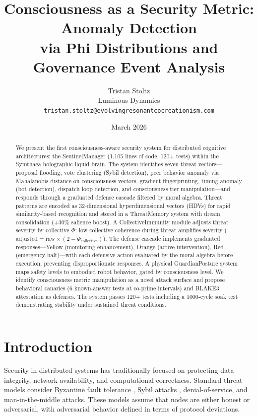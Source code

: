 \documentclass[11pt,a4paper]{article}
\title{Consciousness as a Security Metric: Anomaly Detection\\via Phi Distributions and Governance Event Analysis}
\author{
  Tristan Stoltz \\
  Luminous Dynamics \\
  \texttt{tristan.stoltz@evolvingresonantcocreationism.com}
}
\date{March 2026}
\begin{document}
\maketitle

\begin{abstract}
We present the first consciousness-aware security system for distributed cognitive architectures: the SentinelManager (1,105 lines of code, 120+ tests) within the Symthaea holographic liquid brain. The system identifies seven threat vectors---proposal flooding, vote clustering (Sybil detection), peer behavior anomaly via Mahalanobis distance on consciousness vectors, gradient fingerprinting, timing anomaly (bot detection), dispatch loop detection, and consciousness tier manipulation---and responds through a graduated defense cascade filtered by moral algebra. Threat patterns are encoded as 32-dimensional hyperdimensional vectors (HDVs) for rapid similarity-based recognition and stored in a ThreatMemory system with dream consolidation (+30\% salience boost). A CollectiveImmunity module adjusts threat severity by collective $\Phi$: low collective coherence during threat amplifies severity ($\text{adjusted} = \text{raw} \times (2 - \Phi_{\text{collective}})$). The defense cascade implements graduated responses---Yellow (monitoring enhancement), Orange (active intervention), Red (emergency halt)---with each defensive action evaluated by the moral algebra before execution, preventing disproportionate responses. A physical GuardianPosture system maps safety levels to embodied robot behavior, gated by consciousness level. We identify consciousness metric manipulation as a novel attack surface and propose behavioral canaries (6 known-answer tests at co-prime intervals) and BLAKE3 attestation as defenses. The system passes 120+ tests including a 1000-cycle soak test demonstrating stability under sustained threat conditions.
\end{abstract}

\section{Introduction}

Security in distributed systems has traditionally focused on protecting data integrity, network availability, and computational correctness. Standard threat models consider Byzantine fault tolerance \citep{lamport1982}, Sybil attacks \citep{douceur2002}, denial-of-service, and man-in-the-middle attacks. These models assume that nodes are either honest or adversarial, with adversarial behavior defined in terms of protocol deviations.
\end{document}
